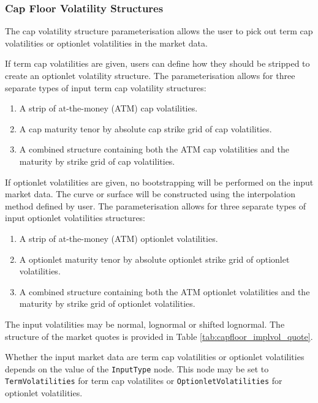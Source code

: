 \subsubsection{Cap Floor Volatility Structures}
\label{sss:capfloorconfig}

The cap volatility structure parameterisation allows the user to pick out term cap volatilities or optionlet volatilities in the market data. 

If term cap volatilities are given, users can define how they should be stripped to create an optionlet volatility structure. The parameterisation allows for three separate types of input term cap volatility structures:

\begin{enumerate}
\item A strip of at-the-money (ATM) cap volatilities.
\item A cap maturity tenor by absolute cap strike grid of cap volatilities.
\item A combined structure containing both the ATM cap volatilities and the maturity by strike grid of cap volatilities.
\end{enumerate}

If optionlet volatilities are given, no bootstrapping will be performed on the input market data. The curve or surface will be constructed using the interpolation method defined by user. The parameterisation allows for three separate types of input optionlet volatilities structures:

\begin{enumerate}
\item A strip of at-the-money (ATM) optionlet volatilities.
\item A optionlet maturity tenor by absolute optionlet strike grid of optionlet volatilities.
\item A combined structure containing both the ATM optionlet volatilities and the maturity by strike grid of optionlet volatilities.
\end{enumerate}

The input volatilities may be normal, lognormal or shifted lognormal. The structure of the market quotes is provided in Table \ref{tab:capfloor_implvol_quote}.

Whether the input market data are term cap volatilities or optionlet volatilities depends on the value of the \lstinline!InputType! node. This node may be set to \lstinline!TermVolatilities! for term cap volatilites or \lstinline!OptionletVolatilities! for optionlet volatilities.

